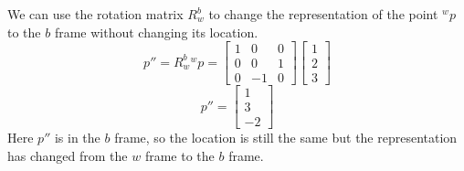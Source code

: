 \documentclass[answers]{exam}
\begin{document}
\begin{questions}
\begin{parts}
\begin{solution}
            We can use the rotation matrix $R^b_w$ to change the representation of the
            point ${^w}p$ to the $b$ frame without changing its location.
            \begin{equation*}
                p'' = R^b_w {^w}p = \begin{bmatrix}
                    1 & 0  & 0 \\
                    0 & 0  & 1 \\
                    0 & -1 & 0
                \end{bmatrix}
                \begin{bmatrix}
                    1 \\
                    2 \\
                    3
                \end{bmatrix}
            \end{equation*}
            \begin{equation*}
                p'' = \begin{bmatrix}
                    1 \\
                    3 \\
                    -2
                \end{bmatrix}
            \end{equation*}
            Here $p''$ is in the $b$ frame, so the location is still the same but the representation has changed
            from the $w$ frame to the $b$ frame.
        \end{solution}

\end{parts}
\end{questions}
\end{document}
